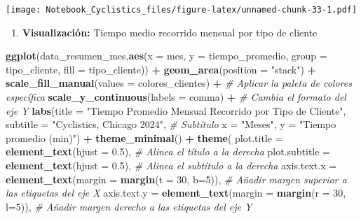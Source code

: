 \documentclass[
]{article}
\newenvironment{Shaded}{\begin{snugshade}}{\end{snugshade}}
\newcommand{\AttributeTok}[1]{\textcolor[rgb]{0.13,0.29,0.53}{#1}}
\newcommand{\CommentTok}[1]{\textcolor[rgb]{0.56,0.35,0.01}{\textit{#1}}}
\newcommand{\DecValTok}[1]{\textcolor[rgb]{0.00,0.00,0.81}{#1}}
\newcommand{\FloatTok}[1]{\textcolor[rgb]{0.00,0.00,0.81}{#1}}
\newcommand{\FunctionTok}[1]{\textcolor[rgb]{0.13,0.29,0.53}{\textbf{#1}}}
\newcommand{\NormalTok}[1]{#1}
\newcommand{\SpecialCharTok}[1]{\textcolor[rgb]{0.81,0.36,0.00}{\textbf{#1}}}
\newcommand{\StringTok}[1]{\textcolor[rgb]{0.31,0.60,0.02}{#1}}
\providecommand{\tightlist}{%
  \setlength{\itemsep}{0pt}\setlength{\parskip}{0pt}}
\begin{document}
\texttt{[image: Notebook\_Cyclistics\_files/figure-latex/unnamed-chunk-33-1.pdf]}

\begin{enumerate}
\def\labelenumi{\arabic{enumi}.}
\setcounter{enumi}{2}
\tightlist
\item
  \textbf{Visualización:} Tiempo medio recorrido mensual por tipo de
  cliente
\end{enumerate}

\begin{Shaded}
\begin{Highlighting}[]
\FunctionTok{ggplot}\NormalTok{(data\_resumen\_mes,}\FunctionTok{aes}\NormalTok{(}\AttributeTok{x =}\NormalTok{ mes, }\AttributeTok{y =}\NormalTok{ tiempo\_promedio, }\AttributeTok{group =}\NormalTok{ tipo\_cliente, }\AttributeTok{fill =}\NormalTok{ tipo\_cliente)) }\SpecialCharTok{+}
  \FunctionTok{geom\_area}\NormalTok{(}\AttributeTok{position =} \StringTok{"stack"}\NormalTok{) }\SpecialCharTok{+}
  \FunctionTok{scale\_fill\_manual}\NormalTok{(}\AttributeTok{values =}\NormalTok{ colores\_clientes) }\SpecialCharTok{+} \CommentTok{\# Aplicar la paleta de colores específica}
  \FunctionTok{scale\_y\_continuous}\NormalTok{(}\AttributeTok{labels =}\NormalTok{ comma) }\SpecialCharTok{+} \CommentTok{\# Cambia el formato del eje Y}
  \FunctionTok{labs}\NormalTok{(}\AttributeTok{title =} \StringTok{"Tiempo Promedio Mensual Recorrido por Tipo de Cliente"}\NormalTok{,}
       \AttributeTok{subtitle =} \StringTok{"Cyclistics, Chicago 2024"}\NormalTok{, }\CommentTok{\# Subtítulo}
       \AttributeTok{x =} \StringTok{"Meses"}\NormalTok{,}
       \AttributeTok{y =} \StringTok{"Tiempo promedio (min)"}\NormalTok{) }\SpecialCharTok{+}
  \FunctionTok{theme\_minimal}\NormalTok{() }\SpecialCharTok{+}
  \FunctionTok{theme}\NormalTok{(}
    \AttributeTok{plot.title =} \FunctionTok{element\_text}\NormalTok{(}\AttributeTok{hjust =} \FloatTok{0.5}\NormalTok{),  }\CommentTok{\# Alinea el título a la derecha}
    \AttributeTok{plot.subtitle =} \FunctionTok{element\_text}\NormalTok{(}\AttributeTok{hjust =} \FloatTok{0.5}\NormalTok{), }\CommentTok{\# Alinea el subtítulo a la derecha}
    \AttributeTok{axis.text.x =} \FunctionTok{element\_text}\NormalTok{(}\AttributeTok{margin =} \FunctionTok{margin}\NormalTok{(}\AttributeTok{t =} \DecValTok{30}\NormalTok{, }\AttributeTok{b=}\DecValTok{5}\NormalTok{)), }\CommentTok{\# Añadir margen superior a las etiquetas del eje X }
    \AttributeTok{axis.text.y =} \FunctionTok{element\_text}\NormalTok{(}\AttributeTok{margin =} \FunctionTok{margin}\NormalTok{(}\AttributeTok{r =} \DecValTok{30}\NormalTok{, }\AttributeTok{l=}\DecValTok{5}\NormalTok{)), }\CommentTok{\# Añadir margen derecho a las etiquetas del eje Y}

\end{Highlighting}
\end{Shaded}
\end{document}
